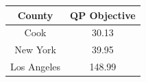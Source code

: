 
\centering
\begin{tabular}[t]{cc}
\toprule
County & QP Objective\\
\midrule
Cook & 30.13\\
New York & 39.95\\
Los Angeles & 148.99\\
\bottomrule
\end{tabular}